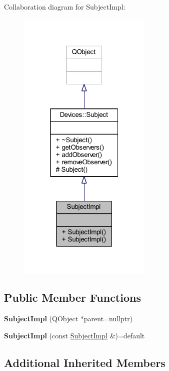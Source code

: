Collaboration diagram for Subject\+Impl\+:\nopagebreak
\begin{figure}[H]
\begin{center}
\leavevmode
\includegraphics[width=181pt]{d9/d7f/class_subject_impl__coll__graph}
\end{center}
\end{figure}
\subsection*{Public Member Functions}
\begin{DoxyCompactItemize}
\item 
\mbox{\label{class_subject_impl_a8cd9bc47afd82f8a957c7a56154cd528}} 
{\bfseries Subject\+Impl} (Q\+Object $\ast$parent=nullptr)
\item 
\mbox{\label{class_subject_impl_a62f084a4816178f5f74514f95af03515}} 
{\bfseries Subject\+Impl} (const \hyperlink{class_subject_impl}{Subject\+Impl} \&)=default
\end{DoxyCompactItemize}
\subsection*{Additional Inherited Members}


